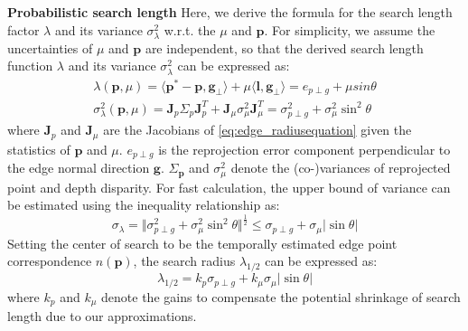 \noindent \textbf{Probabilistic search length}
Here, we derive the formula for the search length factor $\lambda$ and its variance $\sigma_{\lambda}^2$ w.r.t. the $\mu$ and $\mathbf{p}$. For simplicity, we assume the uncertainties of $\mu$ and $\mathbf{p}$ are independent, so that the derived search length function $\lambda$ and its variance $\sigma_{\lambda}^2$ can be expressed as:
\begin{subequations}
\begin{gather}
 \lambda( \mathbf{p},\mu) = \langle \mathbf{p}^* - \mathbf{p},  \mathbf{g}_{\perp} \rangle + \mu \langle \mathbf{l},\mathbf{g}_{\perp} \rangle = e_{p \perp g} + \mu sin \theta  \label{eq:edge_radiusequation} \\
\sigma_{\lambda}^2( \mathbf{p},\mu) = \mathbf{J}_{p} \Sigma_{p} \mathbf{J}_{p}^T +  \mathbf{J}_{\mu} \sigma_{\mu}^2 \mathbf{J}_{ \mu}^T=  \sigma_{p \perp g}^2 + \sigma_{\mu}^2 \sin^2 \theta \label{eq:edge_rediusuncertainty}
\end{gather}
\end{subequations}
where $\mathbf{J}_{p}$ and $\mathbf{J}_{\mu}$ are the Jacobians of \ref{eq:edge_radiusequation} given the statistics of $\mathbf{p}$ and $\mu$. $e_{p \perp g}$ is the reprojection error component perpendicular to the edge normal direction $\mathbf{g}$. 
$\Sigma_{\mathbf{p}}$ and $\sigma_{\mu}^2$ denote the (co-)variances of reprojected point and depth disparity. For fast calculation, the upper bound of variance can be estimated using the inequality relationship as:
\begin{equation} \label{eq:edge_uncertaintyseperation}
\sigma_{\lambda} =\Vert \sigma_{p \perp g}^2 + \sigma_{\mu}^2 \sin^2 \theta \Vert^{\frac{1}{2}} \leq \sigma_{p \perp g} + \sigma_{\mu} | \sin \theta |
\end{equation}
Setting the center of search to be the temporally estimated edge point correspondence $\mathit{n} \left( \mathbf{p} \right)$, the search radius $\lambda_{1/2}$ can be expressed as:
\begin{equation} \label{eq:edge_searchregion}
\lambda_{1/2} =  k_p \sigma_{p \perp g} + k_{\mu} \sigma_{\mu} | \sin \theta | 
\end{equation}
where $k_p$ and $k_{\mu}$ denote the gains to compensate the potential shrinkage of search length due to our approximations. 

